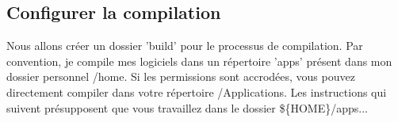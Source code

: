 % 
% 
% 
% 
% 
% 
% 

\subsection{Configurer la compilation}
Nous allons cr\'eer un dossier 'build' pour le processus de compilation. Par convention, je compile mes logiciels dans un r\'epertoire 'apps' pr\'esent dans mon dossier personnel /home. Si les permissions sont accrod\'ees, vous pouvez directement compiler dans votre r\'epertoire /Applications. Les instructions qui suivent pr\'esupposent que vous travaillez dans le dossier \$\{HOME\}/apps...

